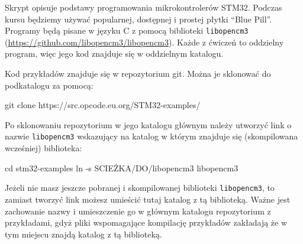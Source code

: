 % 
% 
% 
% 

Skrypt opisuje podstawy programowania mikrokontrolerów STM32. Podczas kursu będziemy używać
popularnej, dostępnej i prostej płytki ``Blue Pill''. Programy będą pisane w języku
C z pomocą biblioteki \Verb$libopencm3$ (\url{https://github.com/libopencm3/libopencm3}).
Każde z ćwiczeń to oddzielny program, więc jego kod znajduje się w oddzielnym katalogu.

Kod przykładów znajduje się w repozytorium git. Można je sklonować do podkatalogu za pomocą:

\begin{CodeFrame*}[bash]{}
  git clone https://src.opcode.eu.org/STM32-examples/
\end{CodeFrame*}

Po sklonowaniu repozytorium w jego katalogu głównym należy utworzyć link o nazwie \Verb$libopencm3$ wskazujący na katalog w którym znajduje się (skompilowana wcześniej) biblioteka:

\begin{CodeFrame*}[bash]{}
  cd stm32-examples
  ln -s SCIEŻKA/DO/libopencm3 libopencm3
\end{CodeFrame*}

Jeżeli nie masz jeszcze pobranej i skompilowanej biblioteki \Verb$libopencm3$, to zamiast tworzyć link możesz umieścić tutaj katalog z tą biblioteką.
Ważne jest zachowanie nazwy i umieszczenie go w głównym katalogu repozytorium z przykładami, gdyż pliki wspomagające kompilację przykładów zakładają że w tym miejscu znajdą katalog z tą biblioteką.

